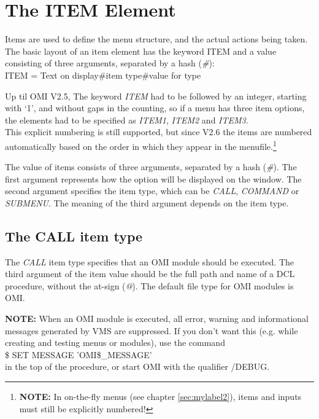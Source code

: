 \documentclass[a4paper]{book}
\newcommand{\vs}{\vspace{3mm}}
\renewcommand{\indent}{\hspace*{5mm}}
\begin{document}
\section{The ITEM Element}
\label{subsec:mylabel4}

Items are used to define the menu structure, and the actual actions being 
taken. The basic layout of an item element has the keyword ITEM and a value
consisting of three arguments, separated by a hash 
(\textsl{{\#}}): \\
\indent\textsf{ITEM = Text on display{\#}item type{\#}value for type} 

\vs

Up til OMI V2.5, The keyword \textsl{ITEM} had to be followed by an integer, starting with `1', and 
without gaps in the counting, so if a menu has three item options, the 
elements had to be specified as \textsl{ITEM1}, \textsl{ITEM2} and \textsl{ITEM3}.\\
This explicit numbering is still supported, but since V2.6 the items are numbered automatically based
on the order in which they appear in the menufile.\footnote{ \textbf{NOTE:} In on-the-fly menus (see chapter \ref{sec:mylabel2}), items and inputs must still be explicitly numbered!}

\vs

The value of items consists of three arguments, separated by a hash (\textsl{{\#}}). 
The first argument represents how the option will be displayed on the 
window. The second argument specifies the item type, which can be \textsl{CALL}, 
\textsl{COMMAND} or \textsl{SUBMENU}. The meaning of the third argument depends on the item 
type.

\subsection{The CALL item type}
\label{subsubsec:mylabel34}

The \textsl{CALL} item type specifies that an OMI 
module should be executed. The third argument of the item value should be 
the full path and name of a DCL procedure, without the at-sign (\textsl{@}). The 
default file type for OMI modules is OMI.

\vs

\hspace{-8mm}\textbf{NOTE:} When an OMI module is executed, all error, warning and 
informational messages generated by VMS are suppressed. If you don't want 
this (e.g. while creating and testing menus or modules), use the command \\
\indent\textsf{{\$} SET MESSAGE 'OMI{\$}{\_}MESSAGE'} \\
in the top of the procedure, or start OMI with the qualifier 
\textsf{/DEBUG}.
\end{document}
